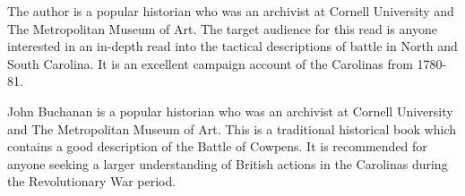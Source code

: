 The author is a popular historian who was an archivist at Cornell University
and The Metropolitan Museum of Art. The target audience for this read is anyone
interested in an in-depth read into the tactical descriptions of battle in
North and South Carolina. It is an excellent campaign account of the Carolinas
from 1780-81.

John Buchanan is a popular historian who was an archivist at Cornell University
and The Metropolitan Museum of Art. This is a traditional historical book which
contains a good description of the Battle of Cowpens.  It is recommended for
anyone seeking a larger understanding of British actions in the Carolinas
during the Revolutionary War period.

